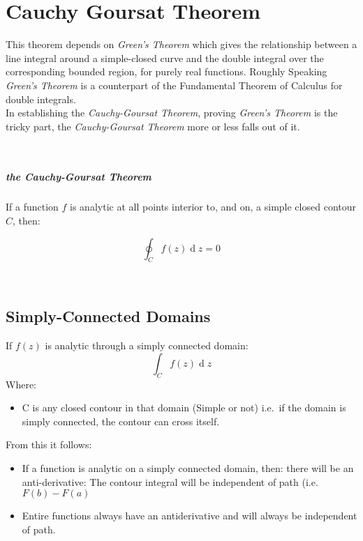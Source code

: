 \documentclass[class=article, crop=false]{standalone}
\begin{document}
\hypertarget{cauchy-goursat-theorem}{%
\section{Cauchy Goursat Theorem}\label{cauchy-goursat-theorem}}

This theorem depends on \emph{Green's Theorem} which gives the
relationship between a line integral around a simple-closed curve and
the double integral over the corresponding bounded region, for purely
real functions. Roughly Speaking \emph{Green's Theorem} is a counterpart
of the Fundamental Theorem of Calculus for double integrals.\\
In establishing the \emph{Cauchy-Goursat Theorem}, proving \emph{Green's
Theorem} is the tricky part, the \emph{Cauchy-Goursat Theorem} more or
less falls out of it.

~~

\hypertarget{the-cauchy-goursat-theorem}{%
\subparagraph{\texorpdfstring{the \emph{Cauchy-Goursat
Theorem}}{the Cauchy-Goursat Theorem}}\label{the-cauchy-goursat-theorem}}

If a function \(f\) is analytic at all points interior to, and on, a
simple closed contour \(C\), then:

\[\oint^{}_{C} f\left( z \right)   \operatorname{d}z = 0\]

~~

\hypertarget{simply-connected-domains}{%
\subsection{Simply-Connected Domains}\label{simply-connected-domains}}

If \(f\left( z \right)\) is analytic through a simply connected domain:
\[\int^{}_{C} f\left( z \right)   \operatorname{d}z\] Where:

\begin{itemize}
\item
  C is any closed contour in that domain (Simple or not) i.e.~if the
  domain is simply connected, the contour can cross itself.
\end{itemize}

From this it follows:

\begin{itemize}
\item
  If a function is analytic on a simply connected domain, then: there
  will be an anti-derivative: The contour integral will be independent
  of path (i.e.\(F(b) - F(a)\)
\item
  Entire functions always have an antiderivative and will always be
  independent of path.
\end{itemize}
\end{document}
